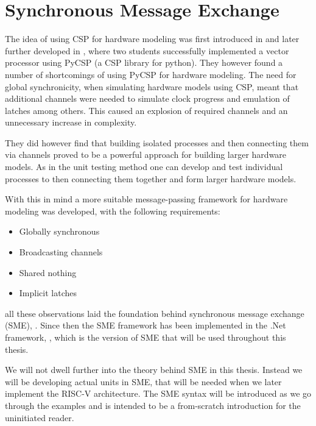 \section{Synchronous Message Exchange}
    The idea of using CSP for hardware modeling was first introduced in \citet{BPUSimulator2013} and later further developed in \cite{PyCSPFPGA}, where two students successfully implemented a vector processor using PyCSP (a CSP library for python).  They however found a number of shortcomings of using PyCSP for hardware modeling. The need for global synchronicity, when simulating hardware models using CSP, meant that additional channels were needed to simulate clock progress and emulation of latches among others. This caused an explosion of required channels and an unnecessary increase in complexity.
    
    They did however find that building isolated processes and then connecting them via channels proved to be a powerful approach for building larger hardware models. As in the unit testing method one can develop and test individual processes to then connecting them together and form larger hardware models.
    
    With this in mind a more suitable message-passing framework for hardware modeling was developed, with the following requirements:
    
    \begin{itemize}
        \item Globally synchronous
        \item Broadcasting channels
        \item Shared nothing
        \item Implicit latches
    \end{itemize} 
    
    all these observations laid the foundation behind synchronous message exchange (SME),  \citet{vinter2014synchronous}. 
    Since then the SME framework has been implemented in the .Net framework, \citet{skovhede2016building}, which is the version of SME that will be used throughout this thesis.
    
    We will not dwell further into the theory behind SME in this thesis. Instead we will be developing actual units in SME, that will be needed when we later implement the RISC-V architecture. The SME syntax will be introduced as we go through the examples and is intended to be a from-scratch introduction for the uninitiated reader. 

